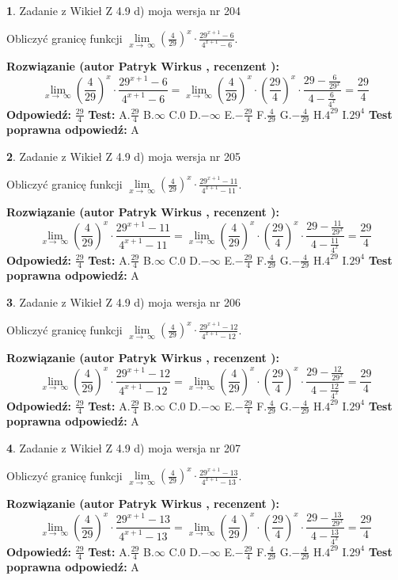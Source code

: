 \documentclass[12pt, a4paper]{article}
\theoremstyle{definition} %
\newtheorem{zad}{}
\newcommand{\zadStart}[1]{\begin{zad}#1\newline}
\newcommand{\zadStop}{\end{zad}}
\newcommand{\rozwStart}[2]{\noindent \textbf{Rozwiązanie (autor #1 , recenzent #2): }\newline}
\newcommand{\rozwStop}{\newline}
\newcommand{\odpStart}{\noindent \textbf{Odpowiedź:}\newline}
\newcommand{\odpStop}{\newline}
\newcommand{\testStart}{\noindent \textbf{Test:}\newline}
\newcommand{\testStop}{\newline}
\newcommand{\kluczStart}{\noindent \textbf{Test poprawna odpowiedź:}\newline}
\newcommand{\kluczStop}{\newline}
\begin{document}
\zadStart{Zadanie z Wikieł Z 4.9 d) moja wersja nr 204}


Obliczyć granicę funkcji  $\lim\limits_{x\to\ \infty}(\frac{4}{29})^{x}\cdot\frac{29^{x+1}-6}{4^{x+1}-6}$.
\zadStop
\rozwStart{Patryk Wirkus}{}
$$\lim\limits_{x\to\ \infty}(\frac{4}{29})^{x}\cdot\frac{29^{x+1}-6}{4^{x+1}-6}=\lim\limits_{x\to\ \infty}(\frac{4}{29})^{x}\cdot(\frac{29}{4})^{x} \cdot \frac{29-\frac{6}{29^{x}}}{4-\frac{6}{4^{x}}} = \frac{29}{4}$$
\rozwStop
\odpStart
$\frac{29}{4}$
\odpStop
\testStart
A.$\frac{29}{4}$ B.$\infty$ C.$0$ D.$-\infty$ E.$-\frac{29}{4}$
F.$\frac{4}{29}$ G.$-\frac{4}{29}$
H.$4^{29}$
I.$29^{4}$
\testStop
\kluczStart
A
\kluczStop



\zadStart{Zadanie z Wikieł Z 4.9 d) moja wersja nr 205}


Obliczyć granicę funkcji  $\lim\limits_{x\to\ \infty}(\frac{4}{29})^{x}\cdot\frac{29^{x+1}-11}{4^{x+1}-11}$.
\zadStop
\rozwStart{Patryk Wirkus}{}
$$\lim\limits_{x\to\ \infty}(\frac{4}{29})^{x}\cdot\frac{29^{x+1}-11}{4^{x+1}-11}=\lim\limits_{x\to\ \infty}(\frac{4}{29})^{x}\cdot(\frac{29}{4})^{x} \cdot \frac{29-\frac{11}{29^{x}}}{4-\frac{11}{4^{x}}} = \frac{29}{4}$$
\rozwStop
\odpStart
$\frac{29}{4}$
\odpStop
\testStart
A.$\frac{29}{4}$ B.$\infty$ C.$0$ D.$-\infty$ E.$-\frac{29}{4}$
F.$\frac{4}{29}$ G.$-\frac{4}{29}$
H.$4^{29}$
I.$29^{4}$
\testStop
\kluczStart
A
\kluczStop



\zadStart{Zadanie z Wikieł Z 4.9 d) moja wersja nr 206}


Obliczyć granicę funkcji  $\lim\limits_{x\to\ \infty}(\frac{4}{29})^{x}\cdot\frac{29^{x+1}-12}{4^{x+1}-12}$.
\zadStop
\rozwStart{Patryk Wirkus}{}
$$\lim\limits_{x\to\ \infty}(\frac{4}{29})^{x}\cdot\frac{29^{x+1}-12}{4^{x+1}-12}=\lim\limits_{x\to\ \infty}(\frac{4}{29})^{x}\cdot(\frac{29}{4})^{x} \cdot \frac{29-\frac{12}{29^{x}}}{4-\frac{12}{4^{x}}} = \frac{29}{4}$$
\rozwStop
\odpStart
$\frac{29}{4}$
\odpStop
\testStart
A.$\frac{29}{4}$ B.$\infty$ C.$0$ D.$-\infty$ E.$-\frac{29}{4}$
F.$\frac{4}{29}$ G.$-\frac{4}{29}$
H.$4^{29}$
I.$29^{4}$
\testStop
\kluczStart
A
\kluczStop



\zadStart{Zadanie z Wikieł Z 4.9 d) moja wersja nr 207}


Obliczyć granicę funkcji  $\lim\limits_{x\to\ \infty}(\frac{4}{29})^{x}\cdot\frac{29^{x+1}-13}{4^{x+1}-13}$.
\zadStop
\rozwStart{Patryk Wirkus}{}
$$\lim\limits_{x\to\ \infty}(\frac{4}{29})^{x}\cdot\frac{29^{x+1}-13}{4^{x+1}-13}=\lim\limits_{x\to\ \infty}(\frac{4}{29})^{x}\cdot(\frac{29}{4})^{x} \cdot \frac{29-\frac{13}{29^{x}}}{4-\frac{13}{4^{x}}} = \frac{29}{4}$$
\rozwStop
\odpStart
$\frac{29}{4}$
\odpStop
\testStart
A.$\frac{29}{4}$ B.$\infty$ C.$0$ D.$-\infty$ E.$-\frac{29}{4}$
F.$\frac{4}{29}$ G.$-\frac{4}{29}$
H.$4^{29}$
I.$29^{4}$
\testStop
\kluczStart
A
\kluczStop
\end{document}
